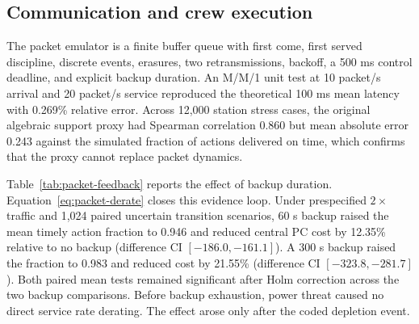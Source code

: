 \documentclass[journal]{IEEEtran}
\begin{document}
\subsection{Communication and crew execution}
\label{sec:crew-results}

The packet emulator is a finite buffer queue with first come, first served
discipline, discrete events, erasures, two retransmissions, backoff, a 500 ms control deadline,
and explicit backup duration.  An M/M/1 unit test at 10 packet/s arrival and
20 packet/s service reproduced the theoretical 100 ms mean latency with 0.269\%
relative error.  Across 12,000 station stress cases, the original algebraic
support proxy had Spearman correlation 0.860 but mean absolute error 0.243
against the simulated fraction of actions delivered on time, which confirms that the proxy
cannot replace packet dynamics.



Table~\ref{tab:packet-feedback} reports the effect of backup duration.
Equation~\eqref{eq:packet-derate} closes this evidence loop.  Under prespecified
$2\times$ traffic and 1,024 paired uncertain transition scenarios, 60 s backup
raised the mean timely action fraction to 0.946 and reduced central PC cost
by 12.35\% relative to no backup (difference CI $[-186.0,-161.1]$).  A 300 s
backup raised the fraction to 0.983 and reduced cost by 21.55\% (difference CI
$[-323.8,-281.7]$).  Both paired mean tests remained significant after Holm
correction across the two backup comparisons.  Before backup exhaustion, power threat caused no direct
service rate derating.  The effect arose only after the coded depletion event.


\end{document}
